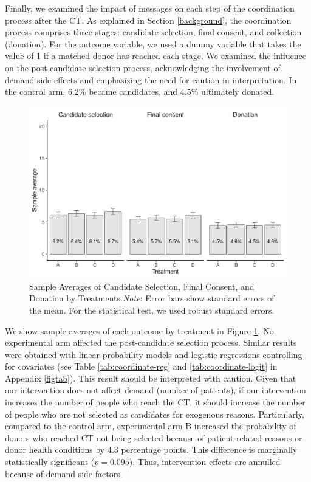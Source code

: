\documentclass [12pt, a4paper]{article}
\begin{document}
Finally, we examined the impact of messages on each step of the coordination process after the CT. As explained in Section \ref{background}, the coordination process comprises three stages: candidate selection, final consent, and collection (donation). For the outcome variable, we used a dummy variable that takes the value of 1 if a matched donor has reached each stage. We examined the influence on the post-candidate selection process, acknowledging the involvement of demand-side effects and emphasizing the need for caution in interpretation. In the control arm, \(6.2\)\% became candidates, and \(4.5\)\% ultimately donated.

\begin{figure}[t]
\includegraphics{JMDP RCT - Main Document_files/figure-latex/coordinate-diff-mean-1} \caption{Sample Averages of Candidate Selection, Final Consent, and Donation by Treatments.\newline \emph{Note}: Error bars show standard errors of the mean. For the statistical test, we used robust standard errors.}\label{fig:coordinate-diff-mean}
\end{figure}

We show sample averages of each outcome by treatment in Figure \ref{fig:coordinate-diff-mean}. No experimental arm affected the post-candidate selection process. Similar results were obtained with linear probability models and logistic regressions controlling for covariates (see Table \ref{tab:coordinate-reg} and \ref{tab:coordinate-logit} in Appendix \ref{figtab}). This result should be interpreted with caution. Given that our intervention does not affect demand (number of patients), if our intervention increases the number of people who reach the CT, it should increase the number of people who are not selected as candidates for exogenous reasons. Particularly, compared to the control arm, experimental arm B increased the probability of donors who reached CT not being selected because of patient-related reasons or donor health conditions by \(4.3\) percentage points. This difference is marginally statistically significant (\(p = 0.095\)). Thus, intervention effects are annulled because of demand-side factors.
\end{document}
